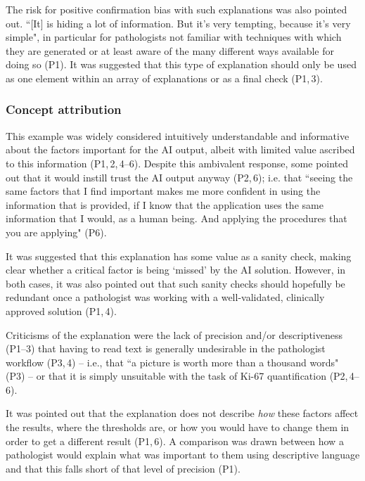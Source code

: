 \documentclass[final,5p,times,twocolumn,hyphens]{elsarticle}
\begin{document}
The risk for positive confirmation bias with such explanations was also pointed out. ``[It] is hiding a lot of information. But it's very tempting, because it's very simple", in particular for pathologists not familiar with techniques with which they are generated or at least aware of the many different ways available for doing so (P1). It was suggested that this type of explanation should only be used as one element within an array of explanations or as a final check (P1,\,3).

\subsubsection{Concept attribution}

This example was widely considered intuitively understandable and informative about the factors important for the AI output, albeit with limited value ascribed to this information (P1,\,2,\,4--6). Despite this ambivalent response, some pointed out that it would instill trust the AI output anyway (P2,\,6); i.e. that ``seeing the same factors that I find important makes me more confident in using the information that is provided, if I know that the application uses the same information that I would, as a human being. And applying the procedures that you are applying" (P6). 


It was suggested that this explanation has some value as a sanity check, making clear whether a critical factor is being `missed' by the AI solution. However, in both cases, it was also pointed out that such sanity checks should hopefully be redundant once a pathologist was working with a well-validated, clinically approved solution (P1,\,4).

Criticisms of the explanation were the lack of precision and/or descriptiveness (P1--3) that having to read text is generally undesirable in the pathologist workflow (P3,\,4) -- i.e., that ``a picture is worth more than a thousand words" (P3) -- or that it is simply unsuitable with the task of Ki-67 quantification (P2,\,4--6). 

It was pointed out that the explanation does not describe \textit{how} these factors affect the results, where the thresholds are, or how you would have to change them in order to get a different result (P1,\,6). A comparison was drawn between how a pathologist would explain what was important to them using descriptive language and that this falls short of that level of precision (P1).
\end{document}
